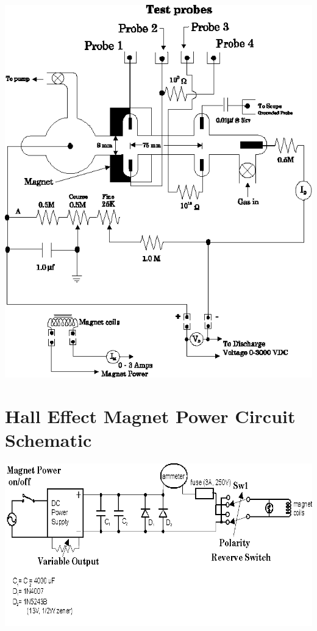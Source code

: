 \documentclass{../lab}
\begin{document}
\begin{center}
    \href{http://experimentationlab.berkeley.edu/sites/default/files/images/DiagramAppartatus.png}{\includegraphics[width=0.8\linewidth]{images/DiagramAppartatus.png}}
\end{center}

\section{Hall Effect Magnet Power Circuit Schematic}

\begin{center}
    \href{http://experimentationlab.berkeley.edu/sites/default/files/images/MagnetReverseCiruit02.png}{\includegraphics[width=0.8\linewidth]{images/MagnetReverseCiruit02.png}}
\end{center}
\end{document}

